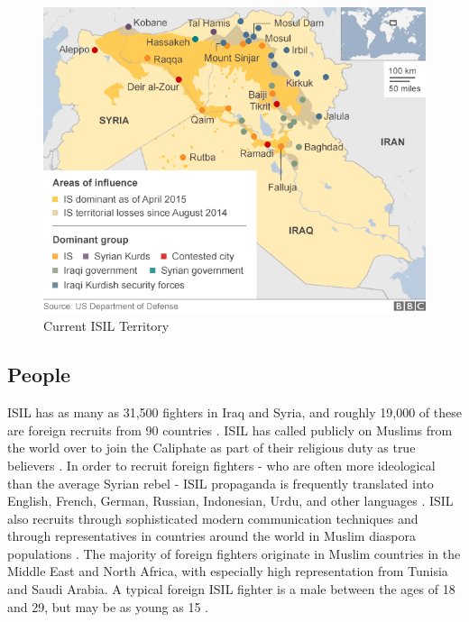\documentclass{report}
\begin{document}
\begin{figure}
 \centering
 \includegraphics[trim = 0cm 0cm 0cm 0cm, clip,scale=0.6]{./figures/current_territory.png}
   \caption{Current ISIL Territory \cite{BBC2015a}}
     \label{fig:current_territory2}
\end{figure}


\subsection{People}

ISIL has as many as 31,500 fighters in Iraq and Syria, and roughly 19,000 of these are foreign recruits from 90 countries \cite{Sengupta2014,TheEditorialBoard2015}. ISIL has called publicly on Muslims from the world over to join the Caliphate as part of their religious duty as true believers \cite{Stern2015}. In order to recruit foreign fighters - who are often more ideological than the average Syrian rebel - ISIL propaganda is frequently translated into English, French, German, Russian, Indonesian, Urdu, and other languages \cite{Stern2015}. ISIL also recruits through sophisticated modern communication techniques and through representatives in countries around the world in Muslim diaspora populations \cite{Masi2014}.  The majority of foreign fighters originate in Muslim countries in the Middle East and North Africa, with especially high representation from Tunisia and Saudi Arabia. A typical foreign ISIL fighter is a male between the ages of 18 and 29, but may be as young as 15 \cite{Stern2015}.
\end{document}
